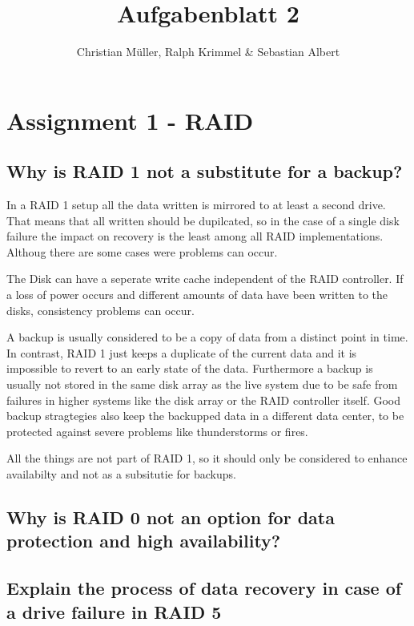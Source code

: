 \documentclass{article}
\begin{document}
\title{Aufgabenblatt 2}
\author{Christian Müller, Ralph Krimmel \& Sebastian Albert }
\maketitle

\section*{Assignment 1 - RAID}

\subsection{Why is RAID 1 not a substitute for a backup?}
	In a RAID 1 setup all the data written is mirrored to at least a second drive.
	That means that all written should be dupilcated,
	so in the case of a single disk failure the impact on recovery is the least among all RAID implementations.
	Althoug there are some cases were problems can occur.

	The Disk can have a seperate write cache independent of the RAID controller.
	If a loss of power occurs and different amounts of data have been written to the disks,
	consistency problems can occur.

	A backup is usually considered to be a copy of data from a distinct point in time.
	In contrast,
	RAID 1 just keeps a duplicate of the current data 
	and it is impossible to revert to an early state of the data.
	Furthermore a backup is usually not stored in the same disk array	as the live system
	due to be safe from failures in higher systems like the disk array or the RAID controller itself.
	Good backup stragtegies also keep the backupped data in a different data center,
	to be protected against severe problems like thunderstorms or fires.

	All the things are not part of RAID 1,
	so it should only be considered to enhance availabilty
	and not as a subsitutie for backups.

\subsection{Why is RAID 0 not an option for data protection and high availability?}

\subsection{Explain the process of data recovery in case of a drive failure in RAID 5}
\end{document}
